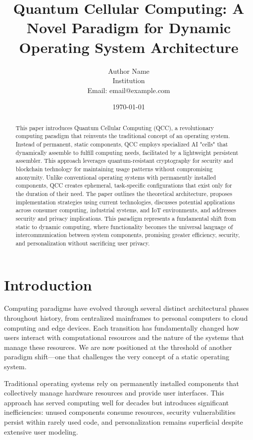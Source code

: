 \documentclass[11pt,a4paper]{article}
\title{\LARGE \textbf{Quantum Cellular Computing: A Novel Paradigm for Dynamic Operating System Architecture}}
\author{Author Name\\
        Institution\\
        Email: email@example.com}
\date{\today}
\begin{document}
\maketitle

\begin{abstract}
This paper introduces Quantum Cellular Computing (QCC), a revolutionary computing paradigm that reinvents the traditional concept of an operating system. Instead of permanent, static components, QCC employs specialized AI "cells" that dynamically assemble to fulfill computing needs, facilitated by a lightweight persistent assembler. This approach leverages quantum-resistant cryptography for security and blockchain technology for maintaining usage patterns without compromising anonymity. Unlike conventional operating systems with permanently installed components, QCC creates ephemeral, task-specific configurations that exist only for the duration of their need. The paper outlines the theoretical architecture, proposes implementation strategies using current technologies, discusses potential applications across consumer computing, industrial systems, and IoT environments, and addresses security and privacy implications. This paradigm represents a fundamental shift from static to dynamic computing, where functionality becomes the universal language of intercommunication between system components, promising greater efficiency, security, and personalization without sacrificing user privacy.
\end{abstract}

\section{Introduction}

Computing paradigms have evolved through several distinct architectural phases throughout history, from centralized mainframes to personal computers to cloud computing and edge devices. Each transition has fundamentally changed how users interact with computational resources and the nature of the systems that manage these resources. We are now positioned at the threshold of another paradigm shift—one that challenges the very concept of a static operating system.

Traditional operating systems rely on permanently installed components that collectively manage hardware resources and provide user interfaces. This approach has served computing well for decades but introduces significant inefficiencies: unused components consume resources, security vulnerabilities persist within rarely used code, and personalization remains superficial despite extensive user modeling.
\end{document}
